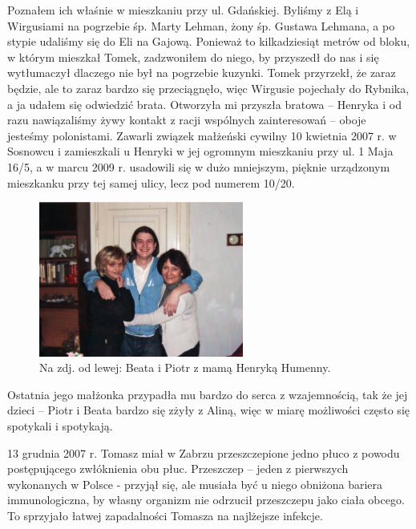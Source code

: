Poznałem ich właśnie w mieszkaniu przy ul. Gdańskiej. Byliśmy z Elą i Wirgusiami na pogrzebie śp. Marty Lehman, żony śp. Gustawa Lehmana, a po stypie udaliśmy się do Eli na Gajową. Ponieważ to kilkadziesiąt metrów od bloku, w którym mieszkał Tomek, zadzwoniłem do niego, by przyszedł do nas i się wytłumaczył dlaczego  nie był na pogrzebie kuzynki. Tomek przyrzekł, że zaraz będzie, ale to zaraz bardzo się przeciągnęło, więc Wirgusie pojechały do Rybnika, a ja udałem się odwiedzić brata. Otworzyła mi przyszła bratowa – Henryka i od razu nawiązaliśmy żywy kontakt z racji wspólnych zainteresowań – oboje jesteśmy polonistami. Zawarli związek małżeński cywilny 10 kwietnia 2007 r. w Sosnowcu i zamieszkali u Henryki w jej ogromnym mieszkaniu przy ul. 1 Maja 16/5, a w marcu 2009 r. usadowili się w dużo mniejszym, pięknie urządzonym mieszkanku przy tej samej ulicy, lecz pod numerem 10/20.
\begin{figure}[!h]
\begin{center}
\includegraphics[width=0.6\textwidth]{photo/henryka_humenny_2.jpg}
\caption[Henryka Świerczyńska]{Na zdj. od lewej: Beata i Piotr z mamą Henryką Humenny.}
\end{center}
\end{figure}

Ostatnia jego małżonka przypadła mu bardzo do serca z wzajemnością, tak że jej dzieci – Piotr i Beata bardzo się zżyły z Aliną, więc w miarę możliwości często się spotykali i spotykają.

13 grudnia 2007 r. Tomasz miał w Zabrzu przeszczepione jedno płuco z powodu postępującego zwłóknienia obu płuc. Przeszczep – jeden z pierwszych wykonanych w Polsce - przyjął się, ale musiała być u niego obniżona bariera immunologiczna, by własny organizm nie odrzucił przeszczepu jako ciała obcego. To sprzyjało łatwej zapadalności Tomasza na najlżejsze infekcje.

